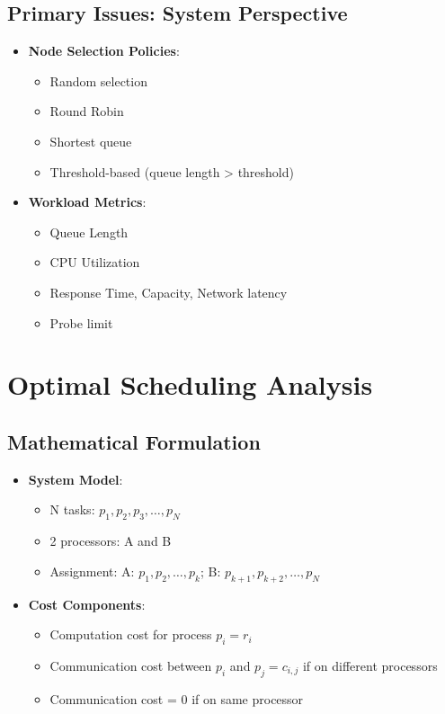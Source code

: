 \documentclass[12pt]{article}
\begin{document}
\subsection{Primary Issues: System Perspective}
\begin{itemize}
\item \textbf{Node Selection Policies}:
  \begin{itemize}
  \item Random selection
  \item Round Robin
  \item Shortest queue
  \item Threshold-based (queue length > threshold)
  \end{itemize}
  
\item \textbf{Workload Metrics}:
  \begin{itemize}
  \item Queue Length
  \item CPU Utilization
  \item Response Time, Capacity, Network latency
  \item Probe limit
  \end{itemize}
\end{itemize}

\section{Optimal Scheduling Analysis}

\subsection{Mathematical Formulation}
\begin{itemize}
\item \textbf{System Model}:
  \begin{itemize}
  \item N tasks: $p_1, p_2, p_3, \ldots, p_N$
  \item 2 processors: A and B
  \item Assignment: A: $p_1, p_2, \ldots, p_k$; B: $p_{k+1}, p_{k+2}, \ldots, p_N$
  \end{itemize}
  
\item \textbf{Cost Components}:
  \begin{itemize}
  \item Computation cost for process $p_i = r_i$
  \item Communication cost between $p_i$ and $p_j = c_{i,j}$ if on different processors
  \item Communication cost = 0 if on same processor
  \end{itemize}
\end{itemize}
\end{document}
